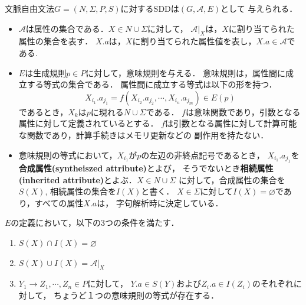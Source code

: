 \documentclass[dvipdfmx,a4j]{jbook}
\begin{document}
\begin{Def}
    文脈自由文法$G=(N,\Sigma,P,S)$に対するSDDは$(G,\mathcal{A},E)$として
    与えられる．
    \begin{itemize}
        \item $\mathcal{A}$は属性の集合である．$X\in N\cup\Sigma$に対して，
              $\mathcal{A}|_X$は，$X$に割り当てられた属性の集合を表す．
              $X.a$は，$X$に割り当てられた属性値を表し，$X.a\in\mathcal{A}$である.
        \item $E$は生成規則$p\in P$に対して，意味規則を与える．
              意味規則は，属性間に成立する等式の集合である．
              属性間に成立する等式は以下の形を持つ．
              \[X_{i_1}.a_{j_1}=f(X_{i_2}.a_{j_2},\cdots,X_{i_n}.a_{j_m})\in E(p)\]
              であるとき，$X_k$は$p$に現れる$N\cup\Sigma$である．
              $f$は意味関数であり，引数となる属性に対して定義されているとする．
              $f$は引数となる属性に対して計算可能な関数であり，計算手続きはメモリ更新などの
              副作用を持たない．
        \item
              意味規則の等式において，$X_{i_1}$が$p$の左辺の非終点記号であるとき，
              $X_{i_1}.a_{j_1}$を{\bf 合成属性(syntheiszed attribute)}とよび，
              そうでないとき{\bf 相続属性(inherited attribute)}とよぶ．$X\in N\cup\Sigma$
              に対して，合成属性の集合を$S(X)$, 相続属性の集合を$I(X)$と書く．
              $X\in\Sigma$に対して$I(X)=\varnothing$であり，すべての属性$X.a$は，
              字句解析時に決定している．
    \end{itemize}

    $E$の定義において，以下の3つの条件を満たす．
    \begin{enumerate}
        \item $S(X)\cap I(X)=\varnothing$
        \item $S(X)\cup I(X)=\mathcal{A}|_X$
        \item $Y_1\rightarrow Z_1,\cdots,Z_n\in P$に対して，
              $Y.a\in S(Y)$および$Z_i.a\in I(Z_i)$のそれぞれに対して，
              ちょうど１つの意味規則の等式が存在する．
    \end{enumerate}
\end{Def}
\end{document}
